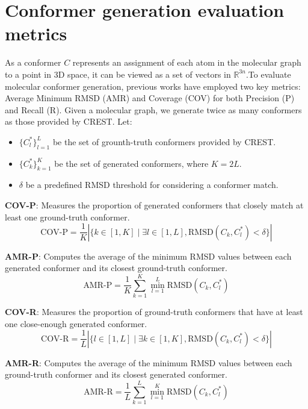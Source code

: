 \section{Conformer generation evaluation metrics}
\label{sub_app:QM9_metrics}
As a conformer $C$ represents an assignment of each atom in the molecular graph to a point in 3D space, it can be viewed as a set of vectors in $\mathbb{R}^{3n}$.To evaluate molecular conformer generation, previous works have employed two key metrics: Average Minimum RMSD (AMR) and Coverage (COV) for both Precision (P) and Recall (R). Given a molecular graph, we generate twice as many conformers as those provided by CREST. Let:
\begin{itemize}
    \item $\{C^*_l\}^L_{l=1}$ be the set of grounth-truth conformers provided by CREST.
    \item $\{C^*_k\}^K_{k=1}$ be the set of generated conformers, where $K=2L$.
    \item $\delta$ be a predefined RMSD threshold for considering a conformer match.
\end{itemize}

\textbf{COV-P}: Measures the proportion of generated conformers that closely match at least one ground-truth conformer.
\[
\text{COV-P} = \frac{1}{K} \left| \{ k \in [1, K] \mid \exists l \in [1, L], \text{RMSD}(C_k, C_l^*) < \delta \} \right|
\]

\textbf{AMR-P}: Computes the average of the minimum RMSD values between each generated conformer and its closest ground-truth conformer.
\[
\text{AMR-P} = \frac{1}{K} \sum_{k=1}^{K} \min_{l=1}^{L} \text{RMSD}(C_k, C_l^*)
\]

\textbf{COV-R}: Measures the proportion of ground-truth conformers that have at least one close-enough generated conformer.
\[
\text{COV-R} = \frac{1}{L} \left| \{ l \in [1, L] \mid \exists k \in [1, K], \text{RMSD}(C_k, C_l^*) < \delta \} \right|
\]

\textbf{AMR-R}: Computes the average of the minimum RMSD values between each ground-truth conformer and its closest generated conformer.
\[
\text{AMR-R} = \frac{1}{L} \sum_{k=1}^{L} \min_{l=1}^{K} \text{RMSD}(C_k, C_l^*)
\]
